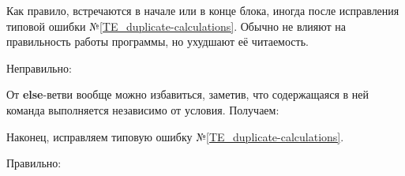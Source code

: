 \begin{typerror}
	\label{TE_duplicate-operations-if-else}

	Как правило, встречаются в начале или в конце блока, иногда после исправления типовой ошибки №\ref{TE_duplicate-calculations}.
	Обычно не влияют на правильность работы программы, но ухудшают её читаемость.

	Неправильно:

	От \textbf{else}-ветви вообще можно избавиться, заметив, что содержащаяся в ней команда выполняется независимо от условия.
	Получаем:


	Наконец, исправляем типовую ошибку №\ref{TE_duplicate-calculations}.

	Правильно:

\end{typerror}
